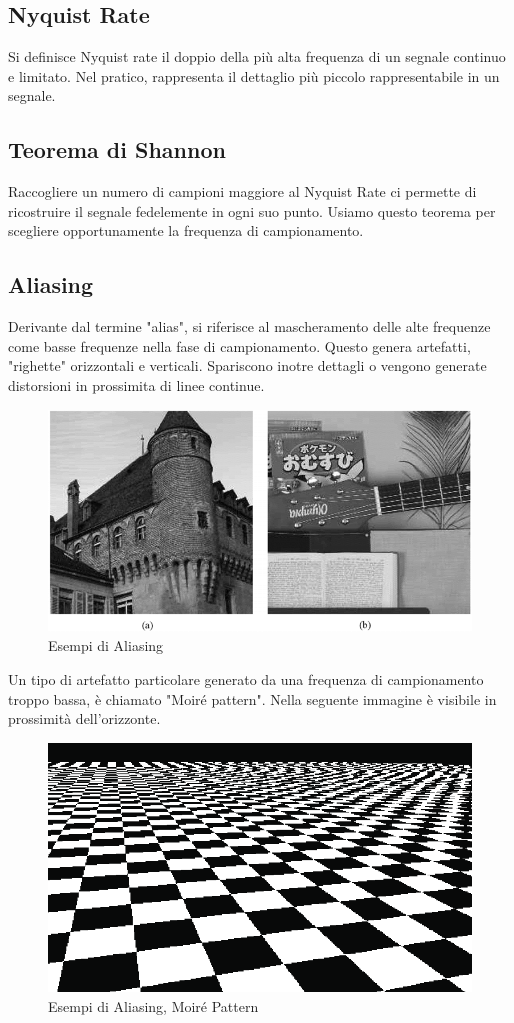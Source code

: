 \documentclass{report}
\begin{document}
	\subsection{Nyquist Rate}
	Si definisce Nyquist rate il doppio della più alta frequenza di un segnale continuo e limitato. Nel pratico, rappresenta il dettaglio più piccolo rappresentabile in un segnale.
	\subsection{Teorema di Shannon}
	Raccogliere un numero di campioni maggiore al Nyquist Rate ci permette di ricostruire il segnale fedelemente in ogni suo punto. Usiamo questo teorema per scegliere opportunamente la frequenza di campionamento.
	\subsection{Aliasing}
	Derivante dal termine "alias", si riferisce al mascheramento delle alte frequenze come basse frequenze nella fase di campionamento. Questo genera artefatti, "righette" orizzontali e verticali. Spariscono inotre dettagli o vengono generate distorsioni in prossimita di linee continue.
	\begin{figure}[htp]
		\centering
		\includegraphics[width=1\linewidth]{aliasingexample.png}
		\caption{Esempi di Aliasing}
	\end{figure}
	Un tipo di artefatto particolare generato da una frequenza di campionamento troppo bassa, è chiamato "Moiré pattern". Nella seguente immagine è visibile in prossimità dell'orizzonte.
	\begin{figure}[htp]
		\centering
		\includegraphics[width=0.7\linewidth]{moirepattern.png}
		\caption{Esempi di Aliasing, Moiré Pattern}
	\end{figure}
\end{document}

